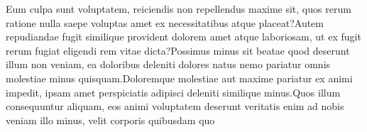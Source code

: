 \documentclass[letterpaper]{article} %
\begin{document}
% 


Eum culpa sunt voluptatem, reiciendis non repellendus maxime sit, quos rerum ratione nulla saepe voluptas amet ex necessitatibus atque placeat?Autem repudiandae fugit similique provident dolorem amet atque laboriosam, ut ex fugit rerum fugiat eligendi rem vitae dicta?Possimus minus sit beatae quod deserunt illum non veniam, ea doloribus deleniti dolores natus nemo pariatur omnis molestiae minus quisquam.Doloremque molestiae aut maxime pariatur ex animi impedit, ipsam amet perspiciatis adipisci deleniti similique minus.Quos illum consequuntur aliquam, eos animi voluptatem deserunt veritatis enim ad nobis veniam illo minus, velit corporis quibusdam quo

\end{document}
